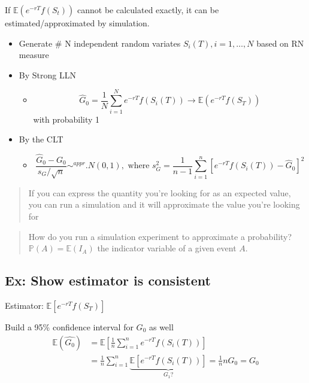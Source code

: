 \documentclass[
  oneside]{book}
\providecommand{\tightlist}{%
  \setlength{\itemsep}{0pt}\setlength{\parskip}{0pt}}
\begin{document}
If \(\mathbb{E}(e^{-rT}f(S_{t}))\) cannot be calculated exactly, it can be estimated/approximated by simulation.

\begin{itemize}
\tightlist
\item
  Generate \# N independent random variates \(S_{i}(T), i=1,\dots,N\) based on RN measure
\item
  By Strong LLN

  \begin{itemize}
  \tightlist
  \item
    \[
    \hat{G}_{0} = \frac{1}{N} \sum^{N}_{i=1}e^{-rT}f(S_{i}(T)) \to \mathbb{E}(e^{-rT}f(S_{T}))
    \] with probability 1
  \end{itemize}
\item
  By the CLT

  \begin{itemize}
  \tightlist
  \item
    \[
    \frac{\hat{G}_0-G_0}{s_G / \sqrt{n}} \sim^{a p p r} . N(0,1), \text { where } s_G^2=\frac{1}{n-1} \sum_{i=1}^n\left[e^{-r T} f\left(S_i(T)\right)-\hat{G}_0\right]^2
    \]
  \end{itemize}
\end{itemize}

\begin{quote}
If you can express the quantity you're looking for as an expected value, you can run a simulation and it will approximate the value you're looking for
\end{quote}

\begin{quote}
How do you run a simulation experiment to approximate a probability?
\(\mathbb{P}(A)=\mathbb{E}(I_{A})\) the indicator variable of a given event \(A\).
\end{quote}

\hypertarget{ex-show-estimator-is-consistent}{%
\subsection{Ex: Show estimator is consistent}\label{ex-show-estimator-is-consistent}}

Estimator: \(\mathbb{E}[e^{-rT}f(S_{T})]\)

Build a 95\% confidence interval for \(G_{0}\) as well
\[
\begin{aligned}
\mathbb{E}(\hat{G_{0}}) &= \mathbb{E}\left[ \frac{1}{n}\sum^{n}_{i=1} e^{-rT}f(S_{i}(T)) \right]\\
&= \frac{1}{n}\sum^{n}_{i=1}\underbrace{ \mathbb{E}[e^{-rT}f(S_{i}(T))] }_{ G_{1}? } = \frac{1}{n}nG_{0} = G_{0}
\end{aligned}
\]
\end{document}
